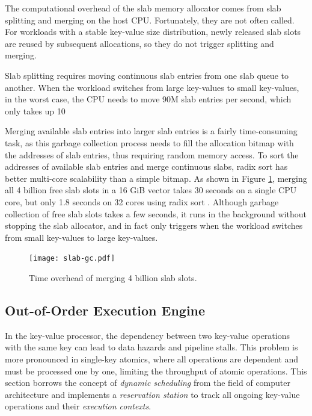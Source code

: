 The computational overhead of the slab memory allocator comes from slab splitting and merging on the host CPU. Fortunately, they are not often called. For workloads with a stable key-value size distribution, newly released slab slots are reused by subsequent allocations, so they do not trigger splitting and merging.

Slab splitting requires moving continuous slab entries from one slab queue to another. When the workload switches from large key-values to small key-values, in the worst case, the CPU needs to move 90M slab entries per second, which only takes up 10%

Merging available slab entries into larger slab entries is a fairly time-consuming task, as this garbage collection process needs to fill the allocation bitmap with the addresses of slab entries, thus requiring random memory access. To sort the addresses of available slab entries and merge continuous slabs, radix sort \cite {satish2010fast} has better multi-core scalability than a simple bitmap. As shown in Figure \ref {kvdirect:fig:slab-garbage-collection}, merging all 4 billion free slab slots in a 16 GiB vector takes 30 seconds on a single CPU core, but only 1.8 seconds on 32 cores using radix sort \cite{satish2010fast}. Although garbage collection of free slab slots takes a few seconds, it runs in the background without stopping the slab allocator, and in fact only triggers when the workload switches from small key-values to large key-values.

\begin{figure}[t]
	\centering
	\texttt{[image: slab-gc.pdf]}
	\caption{Time overhead of merging 4 billion slab slots.}
	\label{kvdirect:fig:slab-garbage-collection}
\end{figure}

\subsection{Out-of-Order Execution Engine}
\label{kvdirect:sec:ooo}

In the key-value processor, the dependency between two key-value operations with the same key can lead to data hazards and pipeline stalls. This problem is more pronounced in single-key atomics, where all operations are dependent and must be processed one by one, limiting the throughput of atomic operations. This section borrows the concept of \textit{dynamic scheduling} from the field of computer architecture and implements a \textit{reservation station} to track all ongoing key-value operations and their \textit{execution contexts}.


